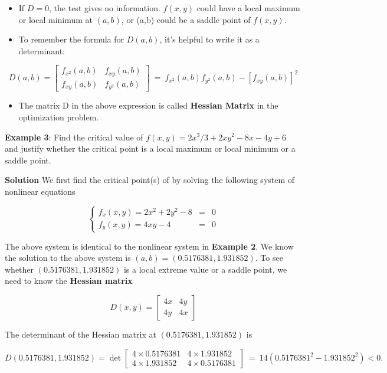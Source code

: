 \documentclass[
]{book}
\providecommand{\tightlist}{%
  \setlength{\itemsep}{0pt}\setlength{\parskip}{0pt}}
\begin{document}
\begin{itemize}
\item
  If \(D=0\), the test gives no information. \(f(x,y)\) could have a local
  maximum or local minimum at \((a,b)\), or (a,b) could be a saddle
  point of \(f(x,y)\).
\item
  To remember the formula for \(D(a,b)\), it's helpful to write it as a
  determinant:
\end{itemize}

\[
D(a,b) = \left[
\begin{array}{cc}
f_{x^2}(a,b) & f_{xy}(a,b)\\
f_{xy}(a,b)  & f_{y^2}(a,b)
\end{array}
\right]
~=~ f_{x^2}(a,b)f_{y^2}(a,b)-[f_{xy}(a,b)]^2
\]

\begin{itemize}
\tightlist
\item
  The matrix D in the above expression is called \textbf{Hessian Matrix} in
  the optimization problem.
\end{itemize}

\hfill\break

\textbf{Example 3}: Find the critical value of
\(f(x,y) = 2x^3/3 + 2xy^2 - 8x - 4y + 6\) and justify whether the critical
point is a local maximum or local minimum or a saddle point.

\textbf{Solution} We first find the critical point(s) of by solving the
following system of nonlinear equations

\[
\left\{
\begin{array}{llcl}
f_x(x,y) = 2x^2 + 2y^2 - 8 & = & 0\\
f_y(x,y) = 4xy - 4 & = & 0
\end{array}
\right.
\]

The above system is identical to the nonlinear system in \textbf{Example 2}.
We know the solution to the above system is \((a,b) = (0.5176381, 1.931852)\).
To see whether \((0.5176381, 1.931852)\) is a local extreme value or a
saddle point, we need to know the \textbf{Hessian matrix}

\[
D(x,y) = \left[
\begin{array}{cc}
4x & 4y\\
4y & 4x
\end{array}
\right]
\]

The determinant of the Hessian matrix at \((0.5176381, 1.931852)\) is

\[
D(0.5176381, 1.931852) = \det \left[
\begin{array}{cc}
4\times 0.5176381 & 4\times 1.931852\\
4\times 1.931852 & 4\times 0.5176381
\end{array}
\right]
~=~ 14(0.5176381^2- 1.931852^2) < 0.
\]
\end{document}
